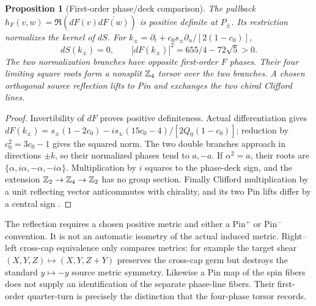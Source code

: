 \documentclass[11pt]{article}
\theoremstyle{readable}
\newtheorem{proposition}[theorem]{Proposition}
\theoremstyle{remark}\newtheorem{remark}[theorem]{Remark}
\begin{document}
\begin{proposition}[First-order phase/deck comparison]
The pullback $h_F(v,w)=\Re(dF(v)\overline{dF(w)})$ is positive definite at
$P_\pm$. Its restriction normalizes the kernel of $dS$.
For $k_\pm=\partial_t+c_0s_\pm\partial_u/[2(1-c_0)]$,
\[
 dS(k_\pm)=0,\qquad |dF(k_\pm)|^2=655/4-72\sqrt5>0.
\]
The two normalization branches have opposite first-order $F$ phases.
Their four limiting square roots form a nonsplit $\mathbb Z_4$ torsor over the
two branches. A chosen orthogonal source reflection lifts to Pin and
exchanges the two chiral Clifford lines.
\end{proposition}
\begin{proof}
Invertibility of $dF$ proves positive definiteness. Actual differentiation
gives $dF(k_\pm)=s_\pm(1-2c_0)
-i s_\pm(15c_0-4)/[2Q_0(1-c_0)]$; reduction by $c_0^2=3c_0-1$
gives the squared norm. The two double branches approach in directions
$\pm k$, so their normalized phases tend to $a,-a$. If $\alpha^2=a$,
their roots are $\{\alpha,i\alpha,-\alpha,-i\alpha\}$. Multiplication by
$i$ squares to the phase-deck sign, and the extension
$\mathbb Z_2\to\mathbb Z_4\to\mathbb Z_2$ has no group section. Finally Clifford
multiplication by a unit reflecting vector anticommutes with chirality,
and its two Pin lifts differ by a central sign \cite{pin}.
\end{proof}
The reflection requires a chosen positive metric and either a Pin$^+$ or
Pin$^-$ convention. It is not an automatic isometry of the actual induced
metric. Right--left cross-cap equivalence only compares metrics: for example
the target shear $(X,Y,Z)\mapsto(X,Y,Z+Y)$ preserves the cross-cap germ
but destroys the standard $y\mapsto-y$ source metric symmetry.
Likewise a Pin map of the spin fibers does not supply an identification of
the separate phase-line fibers. Their first-order quarter-turn is precisely
the distinction that the four-phase torsor records.
\end{document}
